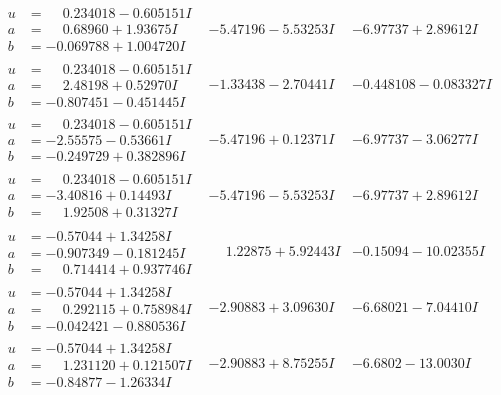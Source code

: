 \documentclass[1p]{elsarticle_modified}
\theoremstyle{definition}
\begin{document}
$$\begin{array}{c|c|c}
\begin{aligned}
u &= \phantom{-}0.234018 - 0.605151 I \\
a &= \phantom{-}0.68960 + 1.93675 I \\
b &= -0.069788 + 1.004720 I\end{aligned}
 & -5.47196 - 5.53253 I & -6.97737 + 2.89612 I \\ \hline\begin{aligned}
u &= \phantom{-}0.234018 - 0.605151 I \\
a &= \phantom{-}2.48198 + 0.52970 I \\
b &= -0.807451 - 0.451445 I\end{aligned}
 & -1.33438 - 2.70441 I & -0.448108 - 0.083327 I \\ \hline\begin{aligned}
u &= \phantom{-}0.234018 - 0.605151 I \\
a &= -2.55575 - 0.53661 I \\
b &= -0.249729 + 0.382896 I\end{aligned}
 & -5.47196 + 0.12371 I & -6.97737 - 3.06277 I \\ \hline\begin{aligned}
u &= \phantom{-}0.234018 - 0.605151 I \\
a &= -3.40816 + 0.14493 I \\
b &= \phantom{-}1.92508 + 0.31327 I\end{aligned}
 & -5.47196 - 5.53253 I & -6.97737 + 2.89612 I \\ \hline\begin{aligned}
u &= -0.57044 + 1.34258 I \\
a &= -0.907349 - 0.181245 I \\
b &= \phantom{-}0.714414 + 0.937746 I\end{aligned}
 & \phantom{-}1.22875 + 5.92443 I & -0.15094 - 10.02355 I \\ \hline\begin{aligned}
u &= -0.57044 + 1.34258 I \\
a &= \phantom{-}0.292115 + 0.758984 I \\
b &= -0.042421 - 0.880536 I\end{aligned}
 & -2.90883 + 3.09630 I & -6.68021 - 7.04410 I \\ \hline\begin{aligned}
u &= -0.57044 + 1.34258 I \\
a &= \phantom{-}1.231120 + 0.121507 I \\
b &= -0.84877 - 1.26334 I\end{aligned}
 & -2.90883 + 8.75255 I & -6.6802 - 13.0030 I \\ \hline\begin{aligned}

\end{aligned}
\end{array}$$
\end{document}

